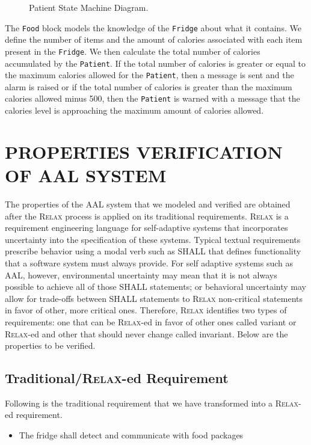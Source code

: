 \documentclass[a4paper,twoside]{article}
\def\myrelax{\textsc{Relax}}                  %
\begin{document}
\begin{figure}[!h]
  \centering
  {}
  \caption{Patient State Machine Diagram.}
  \label{fig:patientstm}
 \end{figure}
 
The \texttt{Food} block models the knowledge of the \texttt{Fridge} about what it contains. We define the number of items and the amount of calories associated with each item present in the \texttt{Fridge}. We then calculate the total number of calories accumulated by the \texttt{Patient}. If the total number of calories is greater or equal to the maximum calories allowed for the \texttt{Patient}, then a message is sent and the alarm is raised or if the total number of calories is greater than the maximum calories allowed minus 500, then the \texttt{Patient} is warned with a message that the calories level is approaching the maximum amount of calories allowed. 

\section{\uppercase{Properties Verification of AAL system}}
\label{sec:properties}
\noindent The properties of the AAL system that we modeled and verified are obtained after the \myrelax{} process is applied on its traditional requirements. \myrelax{}  is  a  requirement  engineering language for self-adaptive systems that incorporates uncertainty into the specification of these systems. Typical  textual  requirements  prescribe behavior  using  a  modal  verb  such  as  SHALL  that defines  functionality  that  a  software  system  must always provide. For self adaptive systems such as AAL, however, environmental  uncertainty  may  mean  that  it  is  not always  possible  to  achieve  all  of  those  SHALL statements; or behavioral uncertainty may allow for trade-offs between SHALL statements to \myrelax{} non-critical  statements  in  favor  of  other,  more  critical ones.  Therefore,  \myrelax{} identifies two types of requirements: one that can be \myrelax{}-ed in favor of other ones called variant or \myrelax{}-ed and other that should never change called invariant.
Below are the properties to be verified. 

\subsection{Traditional/\myrelax{}-ed Requirement}

Following is the traditional requirement that we have transformed into a \myrelax{}-ed requirement.
\begin{itemize}
\item The fridge shall detect and communicate with food packages
\end{itemize}
\end{document}
